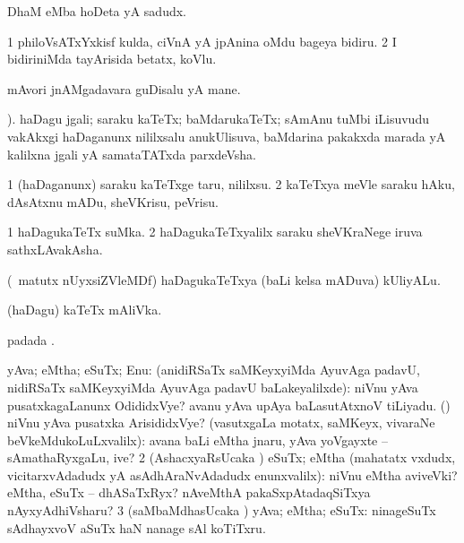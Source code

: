 {{{{{{ \bentry
{} 
\gl{\nA}
\expl{}
\bmng
DhaM eMba hoDeta yA sadudx. 
\emng
\eentry

\bentry
{} 
\gl{\nA}
\expl{}
\bmng
\bnum
\num{1} philoVsATxYxkisf kulda, ciVnA yA jpAnina oMdu bageya bidiru. 
\num{2} I bidiriniMda tayArisida betatx, koVlu. 
\enum
\emng
\eentry

\bentry
{} 
\gl{\nA}
\expl{}
\bmng
mAvori jnAMgadavara guDisalu yA mane. 
\emng
\eentry

\bentry
{} 
\gl{\nA}
 ). \bmng
haDagu jgali; saraku kaTeTx; baMdarukaTeTx; sAmAnu tuMbi iLisuvudu \mo vakAkxgi haDaganunx nililxsalu anukUlisuva, baMdarina pakakxda marada yA kalilxna jgali yA samataTATxda parxdeVsha. 
\emng
\eentry

\bentry
{} 
\gl{\sakirx}
\expl{}
\bmng
\bnum
\num{1} (haDaganunx) saraku kaTeTxge taru, nililxsu. 
\num{2} kaTeTxya meVle saraku hAku, dAsAtxnu mADu, sheVKrisu, peVrisu. 
\enum
\emng
\eentry

\bentry
{} 
\gl{\nA}
\expl{}
\bmng
\bnum
\num{1} haDagukaTeTx suMka. 
\num{2} haDagukaTeTxyalilx saraku sheVKraNege iruva sathxLAvakAsha. 
\enum
\emng
\eentry

\bentry
{} 
\gl{\nA}
\expl{}
\bmng
(\AseTxrXV\ matutx nUyxsiZVleMDf) haDagukaTeTxya (baLi kelsa mADuva) kUliyALu. 
\emng
\eentry

\bentry
{} 
\gl{\nA}
\expl{}
\bmng
(haDagu) kaTeTx mAliVka. 
\emng
\eentry

\bentry
{} 
\gl{\nA}
\expl{}
\bmng
{} padada \bava. 
\emng
\eentry

\bentry
{} 
\expl{}
\bmng
\bnum
{} yAva; eMtha; eSuTx; Enu: 
\banum
{} (anidiRSaTx saMKeyxyiMda AyuvAga  padavU, nidiRSaTx saMKeyxyiMda AyuvAga  padavU baLakeyalilxde):  niVnu yAva pusatxkagaLanunx OdididxVye?  avanu yAva upAya baLasutAtxnoV tiLiyadu. 
 (\AmA)  niVnu yAva pusatxka ArisididxVye? 
 (vasutxgaLa motatx, saMKeyx, vivaraNe beVkeMdukoLuLxvalilx):  avana baLi eMtha jnaru, yAva yoVgayxte -- sAmathaRyxgaLu, ive? 
\eanum
\numie
\num{2} (AshacxyaRsUcaka \gu) eSuTx; eMtha (mahatatx vxdudx, vicitarxvAdadudx yA asAdhAraNvAdadudx enunxvalilx):  niVnu eMtha aviveVki?  eMtha, eSuTx -- dhASaTxRyx?  nAveMthA pakaSxpAtadaqSiTxya nAyxyAdhiVsharu? 
\hypertarget{what(1)3}{} 
\num{3} (saMbaMdhasUcaka \gu) yAva; eMtha; eSuTx:  ninageSuTx sAdhayxvoV aSuTx haN nanage sAl koTiTxru. 
\enum
\emng

}}}}}}
